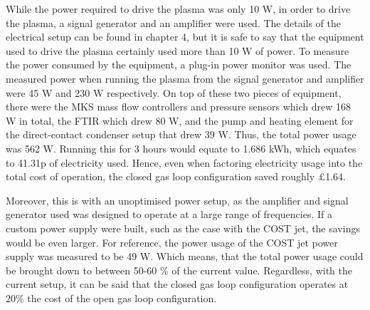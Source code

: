 While the power required to drive the plasma was only 10 W, in order to drive the plasma, a signal generator and an amplifier were used. The details of the electrical setup can be found in chapter 4, but it is safe to say that the equipment used to drive the plasma certainly used more than 10 W of power. To measure the power consumed by the equipment, a plug-in power monitor was used. The measured power when running the plasma from the signal generator and amplifier were 45 W and 230 W respectively. On top of these two pieces of equipment, there were the MKS mass flow controllers and pressure sensors which drew 168 W in total, the FTIR which drew 80 W, and the pump and heating element for the direct-contact condenser setup that drew 39 W. Thus, the total power usage was 562 W. Running this for 3 hours would equate to 1.686 kWh, which equates to 41.31p of electricity used. Hence, even when factoring electricity usage into the total cost of operation, the closed gas loop configuration saved roughly £1.64. 

Moreover, this is with an unoptimised power setup, as the amplifier and signal generator used was designed to operate at a large range of frequencies. If a custom power supply were built, such as the case with the COST jet, the savings would be even larger. For reference, the power usage of the COST jet power supply was measured to be 49 W. Which means, that the total power usage could be brought down to between 50-60 \% of the current value. Regardless, with the current setup, it can be said that the closed gas loop configuration operates at 20\% the cost of the open gas loop configuration.

